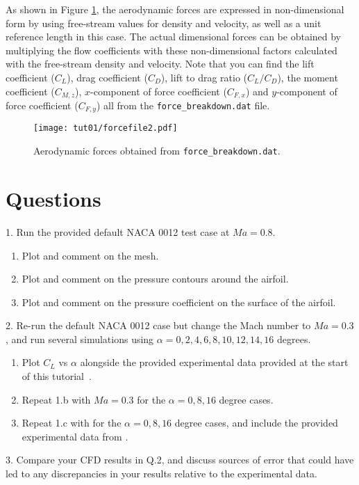 As shown in Figure \ref{fig1:forcefile2}, the aerodynamic forces are expressed in non-dimensional form by using free-stream values for density and velocity, as well as a unit reference length in this case. The actual dimensional forces can be obtained by multiplying the flow coefficients with these non-dimensional factors calculated with the free-stream density and velocity. Note that you can find the lift coefficient ($C_L$), drag coefficient ($C_D$), lift to drag ratio ($C_L / C_D$), the moment coefficient ($C_{M,z}$), $x$-component of force coefficient ($C_{F,x}$) and $y$-component of force coefficient ($C_{F,y}$) all from the \texttt{force\_breakdown.dat} file.
\begin{figure}[H]
	\centering
	\texttt{[image: tut01/forcefile2.pdf]}
	\caption{Aerodynamic forces obtained from \texttt{force\_breakdown.dat}.}
	\label{fig1:forcefile2}
\end{figure}
\section*{Questions}
1. Run the provided default NACA 0012 test case at $Ma=0.8$.
\begin{enumerate}[label=(\alph*)]
    \item Plot and comment on the mesh.
    \item Plot and comment on the pressure contours around the airfoil.
    \item Plot and comment on the pressure coefficient on the surface of the airfoil.
\end{enumerate}
2. Re-run the default NACA 0012 case but change the Mach number to $Ma=0.3$, and run several simulations using $\alpha = 0, 2, 4, 6, 8, 10, 12, 14, 16$ degrees.
\begin{enumerate}[label=(\alph*)]
    \item Plot $C_{L}$ vs $\alpha$ alongside the provided experimental data provided at the start of this tutorial~\cite{ladson1988effects}.
    \item Repeat 1.b with $Ma = 0.3$ for the $\alpha = 0, 8, 16$ degree cases.
    \item Repeat 1.c with for the $\alpha = 0, 8, 16$ degree cases, and include the provided experimental data from \cite{ladson1987pressure}.
\end{enumerate}
3. Compare your CFD results in Q.2, and discuss sources of error that could have led to any discrepancies in your results relative to the experimental data.

